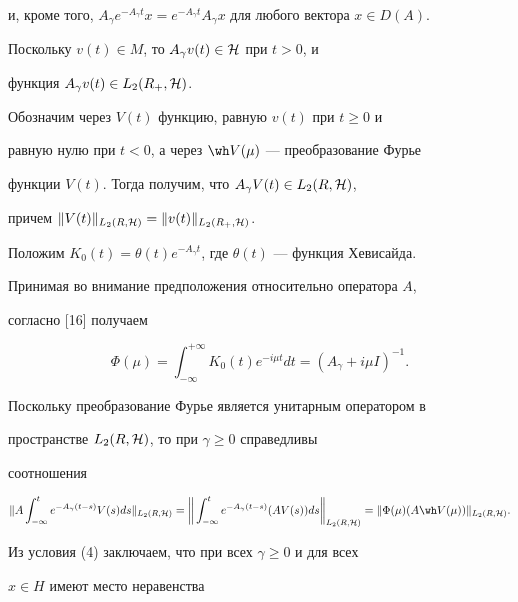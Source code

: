 и, кроме того, $A_{\gamma }e^{-A_{\gamma }t}x=e^{-A_{\gamma


}t}A_{\gamma }x$ для любого вектора $x\in D(A)$.





Поскольку $v(t)\in M$, то $A_{\gamma }v(t)\in {\cal H}$ при $t>0$, и


функция $A_{\gamma }v(t)\in L_2(R_+,{\cal H} )$.





Обозначим через $V(t)$ функцию, равную $v(t)$ при $t\geq 0$ и


равную нулю при $t<0$, а через $\wh V(\mu)$ --- преобразование Фурье


функции $V(t)$. Тогда получим, что $A_{\gamma }V(t)\in L_2(R,{\cal H} )$,


причем $\|V(t)\|_{L_2(R,{\cal H} )}=\|v(t)\|_{L_2(R_+,{\cal H} )}$.





Положим $K_0(t)=\theta (t)e^{-A_{\gamma }t}$, где $\theta


(t)$ --- функция Хевисайда.


Принимая во внимание предположения относительно оператора $A$,


согласно [16] получаем 


$$


\Phi (\mu )=\int_{-\infty }^{+\infty }K_0(t)e^{-i\mu t}dt=


(A_{\gamma }+i\mu I)^{-1}.


$$


Поскольку преобразование Фурье является унитарным оператором в


пространстве $L_2(R,{\cal H} )$, то при $\gamma \geq 0$ справедливы


соотношения


$$


\| A\int_{-\infty }^te^{-A_{\gamma }(t-s)}V(s)ds\|


_{L_2(R,\pH )}= \bigg\| \int_{-\infty } ^te^{-A_{\gamma


}(t-s)}(A V(s))ds\bigg\|_{L_2(R,\pH )}=


\| \Phi (\mu )(A\wh V (\mu )) \|_{L_2(R,\pH )}.


$$


Из условия (4) заключаем, что при всех $\gamma \geq 0$ и для всех


$x\in H$ имеют место неравенства


$$



